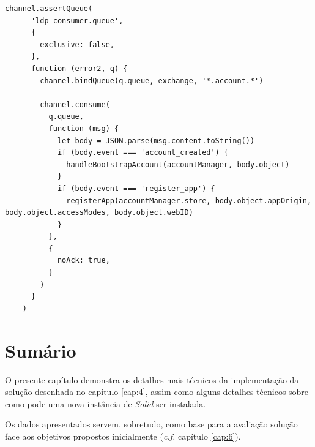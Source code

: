 \begin{lstlisting}[caption={\emph{Consumer} responsável por interpretar os eventos aplicacionais com impacto no sistema de ficheiros}, label={code_storage_consumer_process_events}]
channel.assertQueue(
      'ldp-consumer.queue',
      {
        exclusive: false,
      },
      function (error2, q) {
        channel.bindQueue(q.queue, exchange, '*.account.*')

        channel.consume(
          q.queue,
          function (msg) {
            let body = JSON.parse(msg.content.toString())
            if (body.event === 'account_created') {
              handleBootstrapAccount(accountManager, body.object)
            }
            if (body.event === 'register_app') {
              registerApp(accountManager.store, body.object.appOrigin, body.object.accessModes, body.object.webID)
            }
          },
          {
            noAck: true,
          }
        )
      }
    )

\end{lstlisting}

\section{Sumário}
O presente capítulo demonstra os detalhes mais técnicos da implementação da solução desenhada no capítulo \ref{cap:4}, assim como alguns detalhes técnicos sobre como pode uma nova instância de \emph{Solid} ser instalada.

Os dados apresentados servem, sobretudo, como base para a avaliação solução face aos objetivos propostos inicialmente (\emph{c.f.} capítulo \ref{cap:6}).

